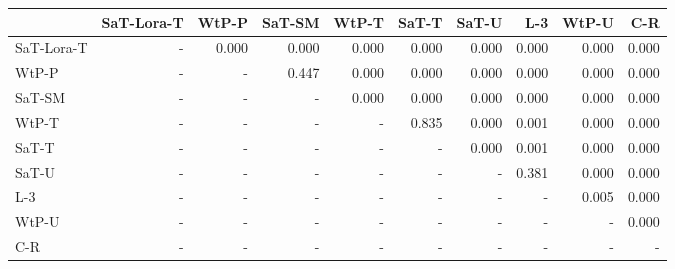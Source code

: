 \begin{tabular}{lrrrrrrrrr}
\toprule
 & SaT-Lora-T & WtP-P & SaT-SM & WtP-T & SaT-T & SaT-U & L-3 & WtP-U & C-R \\
\midrule
SaT-Lora-T & - & 0.000 & 0.000 & 0.000 & 0.000 & 0.000 & 0.000 & 0.000 & 0.000 \\
WtP-P & - & - & 0.447 & 0.000 & 0.000 & 0.000 & 0.000 & 0.000 & 0.000 \\
SaT-SM & - & - & - & 0.000 & 0.000 & 0.000 & 0.000 & 0.000 & 0.000 \\
WtP-T & - & - & - & - & 0.835 & 0.000 & 0.001 & 0.000 & 0.000 \\
SaT-T & - & - & - & - & - & 0.000 & 0.001 & 0.000 & 0.000 \\
SaT-U & - & - & - & - & - & - & 0.381 & 0.000 & 0.000 \\
L-3 & - & - & - & - & - & - & - & 0.005 & 0.000 \\
WtP-U & - & - & - & - & - & - & - & - & 0.000 \\
C-R & - & - & - & - & - & - & - & - & - \\
\bottomrule
\end{tabular}

